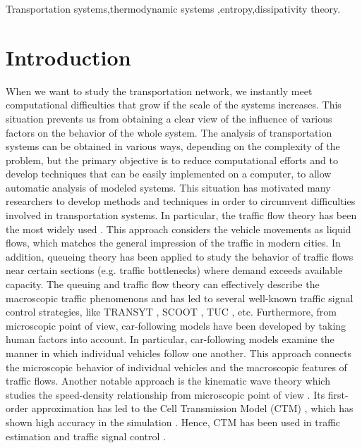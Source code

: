 \documentclass[preprint,authoryear,12pt]{elsarticle}
\begin{document}
\begin{frontmatter}
\begin{keyword}
Transportation systems\sep thermodynamic systems \sep entropy\sep dissipativity theory.
\end{keyword}

\end{frontmatter}

\section{Introduction}


When we want to study the transportation network, we instantly meet computational difficulties that grow if the scale of the systems increases. This situation prevents us from obtaining a clear view of the influence of various factors on the behavior of the whole system. The analysis of transportation systems can be obtained in various ways, depending on the complexity of the problem, but the primary objective is to reduce computational efforts and to develop techniques that can be easily implemented on a computer, to allow automatic analysis of modeled systems. This situation has motivated many researchers to develop methods and techniques in order to circumvent difficulties involved in transportation systems. In particular, 
the traffic flow theory has been the most widely used \citep{nathan_h_gartner_revised_2005}. This approach considers the vehicle movements as liquid flows, which matches the general impression of the traffic in modern cities. In addition, queueing theory has been applied to study the behavior of traffic flows near certain sections (e.g. traffic bottlenecks) where demand exceeds available capacity. The queuing and traffic flow theory can effectively describe the macroscopic traffic phenomenons and has led to several well-known traffic signal control strategies, like TRANSYT \citep{robertson_tansyt_1969,hale_traffic_2005}, SCOOT \citep{bretherton_r_d_scoot_1982}, TUC \citep{diakaki_multivariable_2002,papageorgiou_review_2003}, etc. Furthermore, from microscopic point of view, car-following models have been developed by taking human factors into account. In particular, car-following models examine the manner in which individual vehicles follow one another. This approach connects the microscopic behavior of individual vehicles and the macroscopic features of traffic flows. Another notable approach is the kinematic wave theory which studies the speed-density relationship from microscopic point of view \citep{zhang_kinematic_2002,jin_multicommodity_2004}. Its first-order approximation has led to the Cell Transmission Model (CTM) \citep{daganzo_cell_1995}, which has shown high accuracy in the simulation \citep{almasri_online_2005}. Hence, CTM has been used in traffic estimation \citep{CanudasdeWit2012,tampere_extended_2007} and traffic signal control \citep{Pohlmann2010}.
\end{document}
